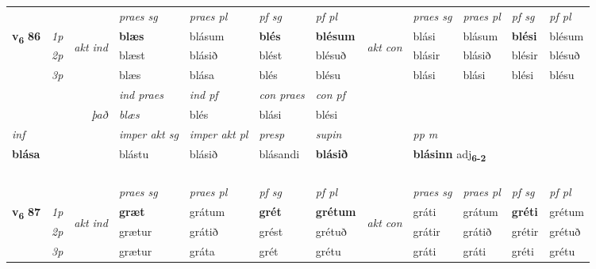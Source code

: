 \begin{longtable}[l]{X>{\footnotesize\itshape}llXXXXlXXXX}
 & &   & \textit{praes sg}  & \textit{praes pl}    & \textit{ pf sg} & \textit{pf pl} & & \textit{praes sg}  & \textit{praes pl}    & \textit{pf sg} & \textit{pf pl }  \\ \cmidrule{4-7} \cmidrule{9-12}
 \multirow{2}{*}{{{\textbf{v{\textsubscript{6}}} \Large{\textbf{86}}}}}  & 1p & \multirow{3}{*}{\begin{turn}{90}\textit{akt ind}\end{turn}} & \textbf{blæs} & blásum & \textbf{blés} & \textbf{blésum} & \multirow{3}{*}{\begin{turn}{90}\textit{akt con}\end{turn}} &blási & blásum & \textbf{blési} & blésum\\*
 & 2p &  &  blæst  & blásið & blést & blésuð & & blásir & blásið & blésir & blésuð \\*
 & 3p &  & blæs & blása & blés & blésu & & blási & blási& blési & blésu \\*
\cmidrule{4-7} \cmidrule{9-12}

   && &  \textit{ind praes} & \textit{ind pf} & \textit{con praes} & \textit{con pf} \\*
\multicolumn{3}{r}{\textit{það}} & blæs & blés & blási & blési \\*

\cmidrule{4-7}
   {\textit{inf}} & &  & \textit{imper akt sg} & \textit{imper akt pl}   & \textit{presp} & \textit{supin}  && \textit{pp m} \\*
  {\textbf{blása}} & && blástu  & blásið   & blásandi &  \textbf{blásið}  && \multicolumn{2}{l}{\textbf{blásinn} adj\textbf{\textsubscript{6-2}}} \\*

\midrule
  & \\*
    & \\*
   & \\*
  & \\
   \midrule
 & &   & \textit{praes sg}  & \textit{praes pl}    & \textit{ pf sg} & \textit{pf pl} & & \textit{praes sg}  & \textit{praes pl}    & \textit{pf sg} & \textit{pf pl }  \\ \cmidrule{4-7} \cmidrule{9-12}
 \multirow{2}{*}{{{\textbf{v{\textsubscript{6}}} \Large{\textbf{87}}}}}  & 1p & \multirow{3}{*}{\begin{turn}{90}\textit{akt ind}\end{turn}} & \textbf{græt} & grátum & \textbf{grét} & \textbf{grétum} & \multirow{3}{*}{\begin{turn}{90}\textit{akt con}\end{turn}} &gráti & grátum & \textbf{gréti} & grétum\\*
 & 2p &  &  grætur  & grátið & grést & grétuð & & grátir & grátið & grétir & grétuð \\*
 & 3p &  & grætur & gráta & grét & grétu & & gráti & gráti& gréti & grétu \\*
\cmidrule{4-7} \cmidrule{9-12}


\end{longtable}
